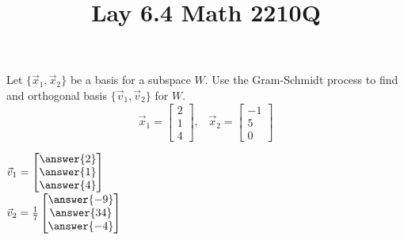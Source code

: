 \documentclass{ximera}
\begin{document}
  	\title{Lay 6.4  \hfill Math 2210Q} 
  	  		    \begin{question} 
  	  		    	Let $\{\vec{x}_1, \vec{x}_2\}$ be a basis for a subspace $W$. Use the Gram-Schmidt process to find and orthogonal basis $\{\vec{v}_1,\vec{v}_2\}$ for $W$.
  	  		    $$\vec{x}_1 = \begin{bmatrix} 2\\1\\4\end{bmatrix}, \hspace{10pt} \vec{x}_2 = \begin{bmatrix} -1\\5\\0\end{bmatrix}$$
  	  		    
  	  		    $\vec{v}_1 = \begin{bmatrix} \answer{2}\\\answer{1}\\\answer{4}\end{bmatrix}$\vspace{10pt}\\
  	  		    $\vec{v}_2 = \frac{1}{7}\begin{bmatrix} \answer{-9}\\\answer{34}\\\answer{-4}\end{bmatrix}$\vspace{10pt}\\
  	  		    
  	  		    	\end{question}
\end{document}
